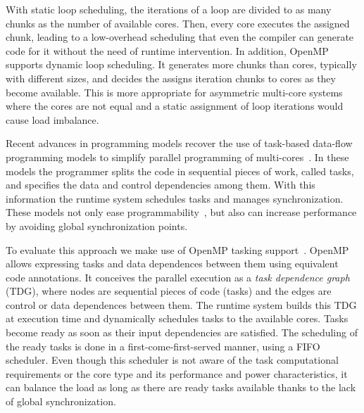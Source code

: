 With static loop scheduling, the iterations of a loop are divided to as many chunks as the number of available cores.
Then, every core executes the assigned chunk, leading to a low-overhead scheduling that
even the compiler can generate code for it without the need of runtime intervention.
In addition, OpenMP supports dynamic loop scheduling. It generates more chunks than
cores, typically with different sizes, and decides the assigns iteration chunks to
cores as they become available. 
This is more appropriate for asymmetric multi-core systems where the cores are not equal and a static 
assignment of loop iterations would cause load imbalance.

Recent advances in programming models recover the use of task-based data-flow programming models to simplify parallel programming of multi-cores~\cite{OpenMP4.0:Manual2013, OmpSs_PPL11, Zuckerman:EXADAPT2011, Bauer.2012.SC, Vandierendonck:PACT2011}. 
In these models the programmer splits the code in sequential pieces of work, called tasks, and specifies the data and
control dependencies among them.  
With this information the runtime system schedules tasks and manages synchronization. These models not only ease programmability~\cite{OpenMP4.0:Manual2013, OmpSs_PPL11, Zuckerman:EXADAPT2011, Bauer.2012.SC, Vandierendonck:PACT2011, Vandierendonck:Hyperq},
but also can increase performance by avoiding global synchronization points.

To evaluate this approach we make use of OpenMP tasking support~\cite{OpenMP4.0:Manual2013}. 
OpenMP allows expressing tasks and data dependences between them using equivalent code annotations. 
It conceives the parallel execution as a \emph{task dependence graph} (TDG), where nodes are 
sequential pieces of code (tasks) and the edges are control or data dependences between them. 
The runtime system builds this TDG at execution time and dynamically schedules tasks to the available cores.
Tasks become ready as soon as their input dependencies are satisfied.
The scheduling of the ready tasks is done in a first-come-first-served manner, using a FIFO scheduler.  
Even though this scheduler is not aware of the task computational requirements or the core type and its performance and power characteristics, it can balance the load as long as there are ready tasks available thanks to the lack of global synchronization.


